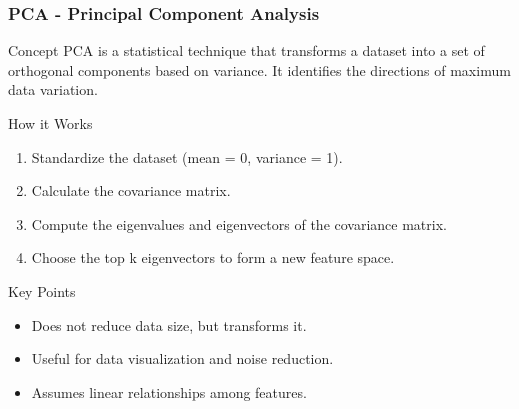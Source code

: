 \documentclass[aspectratio=169]{beamer}
\begin{document}
\begin{frame}[fragile]
    \frametitle{PCA - Principal Component Analysis}
    \begin{block}{Concept}
        PCA is a statistical technique that transforms a dataset into a set of orthogonal components based on variance. It identifies the directions of maximum data variation.
    \end{block}
    
    \begin{block}{How it Works}
        \begin{enumerate}
            \item Standardize the dataset (mean = 0, variance = 1).
            \item Calculate the covariance matrix.
            \item Compute the eigenvalues and eigenvectors of the covariance matrix.
            \item Choose the top k eigenvectors to form a new feature space.
        \end{enumerate}
    \end{block}
    
    \begin{block}{Key Points}
        \begin{itemize}
            \item Does not reduce data size, but transforms it.
            \item Useful for data visualization and noise reduction.
            \item Assumes linear relationships among features.
        \end{itemize}
    \end{block}
\end{frame}
\end{document}
